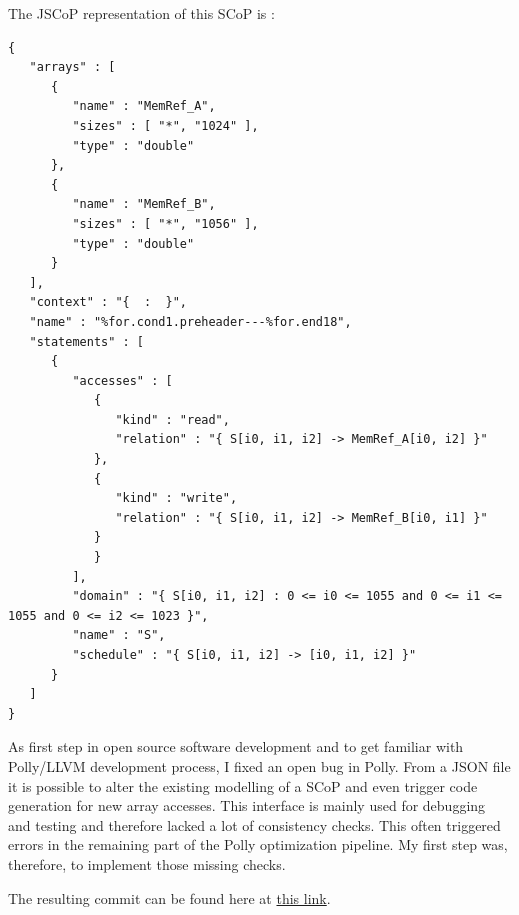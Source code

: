 The JSCoP representation of this SCoP is :
\begin{lstlisting}[frame=single]
{
   "arrays" : [
      {
         "name" : "MemRef_A",
         "sizes" : [ "*", "1024" ],
         "type" : "double"
      },
      {
         "name" : "MemRef_B",
         "sizes" : [ "*", "1056" ],
         "type" : "double"
      }
   ],
   "context" : "{  :  }",
   "name" : "%for.cond1.preheader---%for.end18",
   "statements" : [
      {
         "accesses" : [
            {
               "kind" : "read",
               "relation" : "{ S[i0, i1, i2] -> MemRef_A[i0, i2] }"
            },
            {
               "kind" : "write",
               "relation" : "{ S[i0, i1, i2] -> MemRef_B[i0, i1] }"
            }
            }
         ],
         "domain" : "{ S[i0, i1, i2] : 0 <= i0 <= 1055 and 0 <= i1 <= 1055 and 0 <= i2 <= 1023 }",
         "name" : "S",
         "schedule" : "{ S[i0, i1, i2] -> [i0, i1, i2] }"
      }
   ]
}
\end{lstlisting}

As first step in open source software development and to get familiar with Polly/LLVM development process, I fixed an open bug in Polly. From a JSON file it is possible to alter the existing modelling of a SCoP and even trigger code generation for new array accesses. This interface is mainly used for debugging and testing and therefore lacked a lot of consistency checks. This often triggered errors in the remaining part of the Polly optimization pipeline. My first step was, therefore, to implement those missing checks.

The resulting commit can be found here at \href{https://reviews.llvm.org/D32739}{this link}.